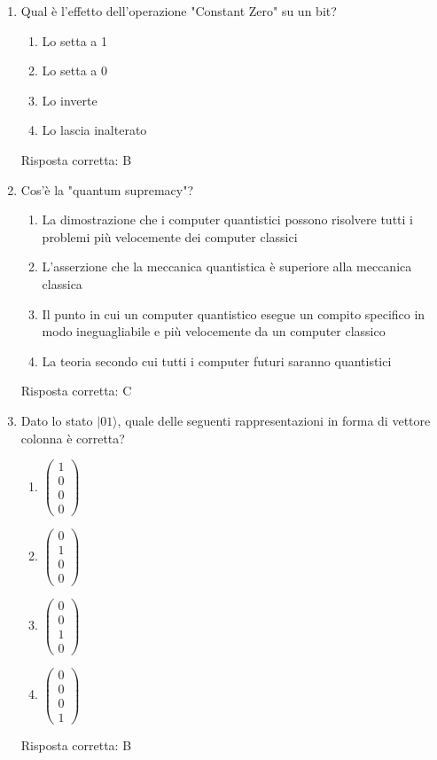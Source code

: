 \documentclass{article}
\begin{document}
\begin{enumerate}[label=\textbf{Domanda \arabic*.}]
\item Qual è l'effetto dell'operazione "Constant Zero" su un bit?
\begin{enumerate}[label=\Alph*.]
    \item Lo setta a 1
    \item Lo setta a 0
    \item Lo inverte
    \item Lo lascia inalterato
\end{enumerate}
Risposta corretta: B

\item Cos'è la "quantum supremacy"?
\begin{enumerate}[label=\Alph*.]
    \item La dimostrazione che i computer quantistici possono risolvere tutti i problemi più velocemente dei computer classici
    \item L'asserzione che la meccanica quantistica è superiore alla meccanica classica
    \item Il punto in cui un computer quantistico esegue un compito specifico in modo ineguagliabile e più velocemente da un computer classico
    \item La teoria secondo cui tutti i computer futuri saranno quantistici
\end{enumerate}
Risposta corretta: C



\item Dato lo stato \(|01\rangle\), quale delle seguenti rappresentazioni in forma di vettore colonna è corretta?
\begin{enumerate}[label=\Alph*.]
    \item \(\begin{pmatrix} 1 \\ 0 \\ 0 \\ 0 \end{pmatrix}\)
    \item \(\begin{pmatrix} 0 \\ 1 \\ 0 \\ 0 \end{pmatrix}\)
    \item \(\begin{pmatrix} 0 \\ 0 \\ 1 \\ 0 \end{pmatrix}\)
    \item \(\begin{pmatrix} 0 \\ 0 \\ 0 \\ 1 \end{pmatrix}\)
\end{enumerate}
Risposta corretta: B


\end{enumerate}
\end{document}
